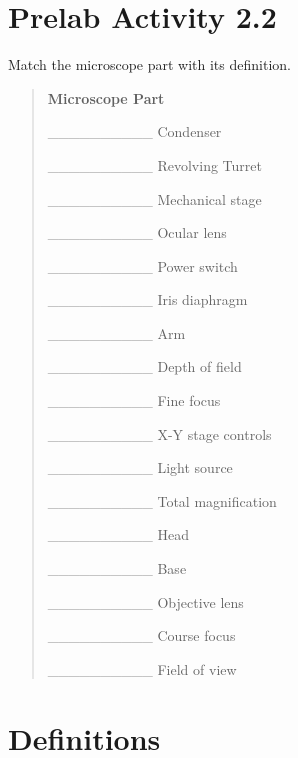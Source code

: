 \documentclass[
  letterpaper,
  DIV=11,
  numbers=noendperiod]{scrreprt}
\begin{document}
\section{\texorpdfstring{\textbf{Prelab Activity
2.2}}{Prelab Activity 2.2}}\label{prelab-activity-2.2-1}

Match the microscope part with its definition.

\begin{quote}
\textbf{Microscope Part}

\_\_\_\_\_\_\_\_\_\_ Condenser

\_\_\_\_\_\_\_\_\_\_ Revolving Turret

\_\_\_\_\_\_\_\_\_\_ Mechanical stage

\_\_\_\_\_\_\_\_\_\_ Ocular lens

\_\_\_\_\_\_\_\_\_\_ Power switch

\_\_\_\_\_\_\_\_\_\_ Iris diaphragm

\_\_\_\_\_\_\_\_\_\_ Arm

\_\_\_\_\_\_\_\_\_\_ Depth of field

\_\_\_\_\_\_\_\_\_\_ Fine focus

\_\_\_\_\_\_\_\_\_\_ X-Y stage controls

\_\_\_\_\_\_\_\_\_\_ Light source

\_\_\_\_\_\_\_\_\_\_ Total magnification

\_\_\_\_\_\_\_\_\_\_ Head

\_\_\_\_\_\_\_\_\_\_ Base

\_\_\_\_\_\_\_\_\_\_ Objective lens

\_\_\_\_\_\_\_\_\_\_ Course focus

\_\_\_\_\_\_\_\_\_\_ Field of view
\end{quote}

\section{\texorpdfstring{\textbf{Definitions}}{Definitions}}\label{definitions}
\end{document}
